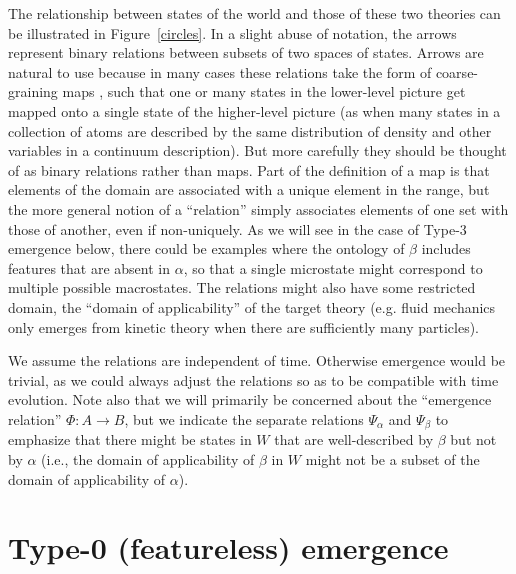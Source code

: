 \documentclass[12pt,english]{article}
\newcommand{\autocite}{\cite}
\begin{document}
The relationship between  states of  the world and  those of  these two theories can be illustrated in Figure~\ref{circles}.
In a slight abuse of notation, the arrows represent binary relations between subsets of two spaces of states.  
Arrows are natural to use because in many cases these relations take the form of  coarse-graining maps \autocite{list2019levels}, such that one or many states in the lower-level picture get mapped onto a single state of the higher-level picture (as when many states in a collection of atoms are described by the same distribution of density and other variables in a continuum description).  
But more carefully they should be thought of as binary relations rather than maps. 
Part of the definition of a map is that elements of the domain are associated with a unique element in the range, but the more general notion of a ``relation” simply associates elements of one set with those of another, even if non-uniquely. 
As we will see in the case of Type-3 emergence below, there could be examples where the ontology of $\beta$ includes features that are absent in  $\alpha$, so that a single microstate might correspond to multiple possible macrostates. 
The  relations might  also have some restricted domain, the ``domain of applicability” of the target theory (e.g. fluid mechanics only emerges from kinetic theory when there are sufficiently many particles).

We assume the relations are independent of time. 
Otherwise emergence would be trivial, as we could always adjust the  relations so as to  be compatible with time evolution. 
Note also that we will primarily be concerned about the ``emergence  relation'' $\Phi:A\rightarrow B$, but we indicate the separate  relations $\Psi_\alpha$ and $\Psi_\beta$ to emphasize that there might be states in  $W$  that are well-described by  $\beta$ but not by $\alpha$ (i.e., the domain of applicability of $\beta$  in  $W$  might not be a subset of the domain of applicability of  $\alpha$).

\section*{Type-0 (featureless) emergence}
\end{document}

